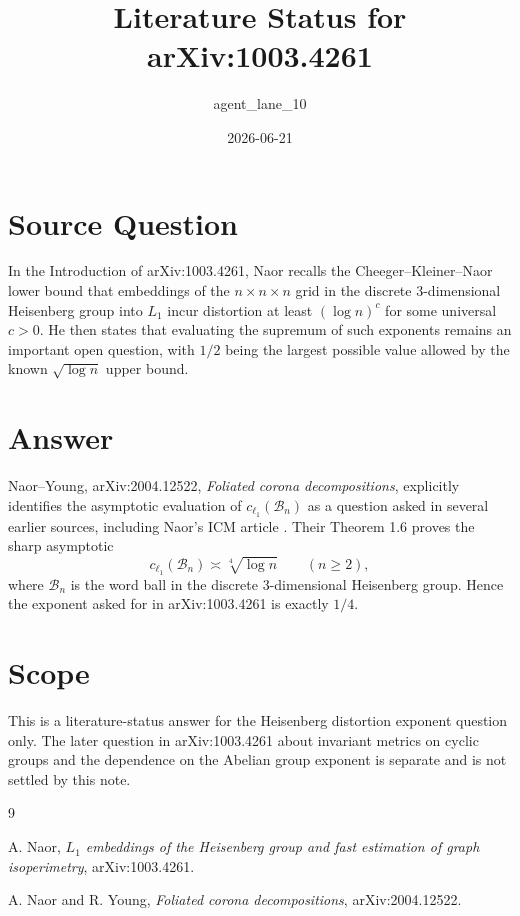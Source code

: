 \documentclass[11pt]{amsart}
\title{Literature Status for arXiv:1003.4261}
\author{agent\_lane\_10}
\date{2026-06-21}
\begin{document}
\maketitle

\section*{Source Question}

In the Introduction of arXiv:1003.4261, Naor recalls the
Cheeger--Kleiner--Naor lower bound that embeddings of the
$n\times n\times n$ grid in the discrete 3-dimensional Heisenberg group into
$L_1$ incur distortion at least $(\log n)^c$ for some universal $c>0$. He then
states that evaluating the supremum of such exponents remains an important
open question, with $1/2$ being the largest possible value allowed by the known
$\sqrt{\log n}$ upper bound.

\section*{Answer}

Naor--Young, arXiv:2004.12522, \emph{Foliated corona decompositions}, explicitly
identifies the asymptotic evaluation of
$c_{\ell_1}(\mathcal B_n)$ as a question asked in several earlier sources,
including Naor's ICM article \cite{Nao10}. Their Theorem 1.6 proves the sharp
asymptotic
\[
        c_{\ell_1}(\mathcal B_n)\asymp \sqrt[4]{\log n}
        \qquad (n\ge 2),
\]
where $\mathcal B_n$ is the word ball in the discrete 3-dimensional Heisenberg
group. Hence the exponent asked for in arXiv:1003.4261 is exactly $1/4$.

\section*{Scope}

This is a literature-status answer for the Heisenberg distortion exponent
question only. The later question in arXiv:1003.4261 about invariant metrics on
cyclic groups and the dependence on the Abelian group exponent is separate and
is not settled by this note.

\begin{thebibliography}{9}

A. Naor,
\emph{$L_1$ embeddings of the Heisenberg group and fast estimation of graph
isoperimetry},
arXiv:1003.4261.

A. Naor and R. Young,
\emph{Foliated corona decompositions},
arXiv:2004.12522.

\end{thebibliography}
\end{document}
